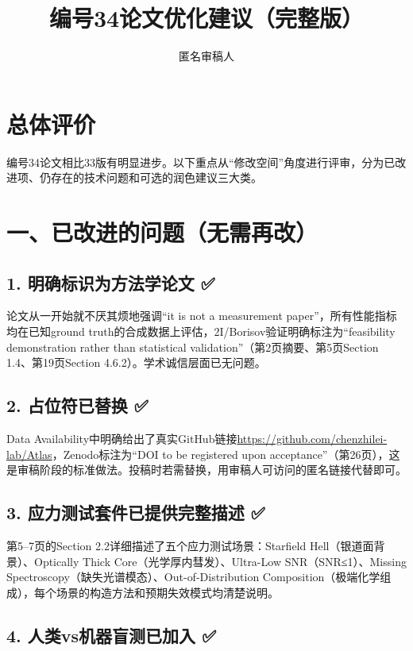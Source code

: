 \documentclass[12pt]{article}
\title{编号34论文优化建议（完整版）}
\author{匿名审稿人}
\date{}
\begin{document}
\maketitle

\section*{总体评价}

编号34论文相比33版有明显进步。以下重点从“修改空间”角度进行评审，分为已改进项、仍存在的技术问题和可选的润色建议三大类。

\section{一、已改进的问题（无需再改）}

\subsection{1. 明确标识为方法学论文 ✅}

论文从一开始就不厌其烦地强调“it is not a measurement paper”，所有性能指标均在已知ground truth的合成数据上评估，2I/Borisov验证明确标注为“feasibility demonstration rather than statistical validation”（第2页摘要、第5页Section 1.4、第19页Section 4.6.2）。学术诚信层面已无问题。

\subsection{2. 占位符已替换 ✅}

Data Availability中明确给出了真实GitHub链接\url{https://github.com/chenzhilei-lab/Atlas}，Zenodo标注为“DOI to be registered upon acceptance”（第26页），这是审稿阶段的标准做法。投稿时若需替换，用审稿人可访问的匿名链接代替即可。

\subsection{3. 应力测试套件已提供完整描述 ✅}

第5–7页的Section 2.2详细描述了五个应力测试场景：Starfield Hell（银道面背景）、Optically Thick Core（光学厚内彗发）、Ultra-Low SNR（SNR≤1）、Missing Spectroscopy（缺失光谱模态）、Out-of-Distribution Composition（极端化学组成），每个场景的构造方法和预期失效模式均清楚说明。

\subsection{4. 人类vs机器盲测已加入 ✅}
\end{document}
